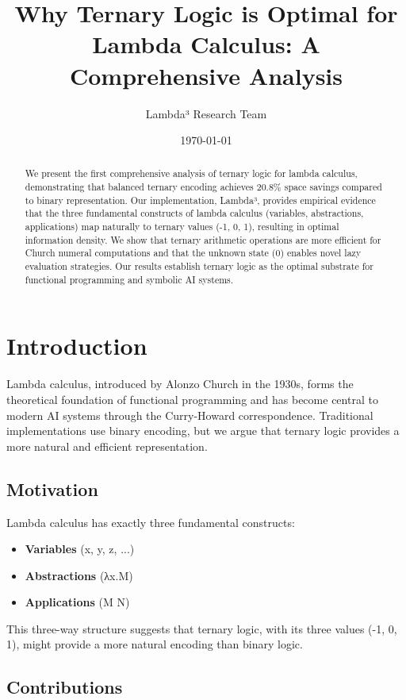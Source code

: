 \documentclass[11pt]{article}
\title{Why Ternary Logic is Optimal for Lambda Calculus: A Comprehensive Analysis}
\author{Lambda³ Research Team}
\date{\today}
\begin{document}
\maketitle

\begin{abstract}
We present the first comprehensive analysis of ternary logic for lambda calculus, demonstrating that balanced ternary encoding achieves 20.8\% space savings compared to binary representation. Our implementation, Lambda³, provides empirical evidence that the three fundamental constructs of lambda calculus (variables, abstractions, applications) map naturally to ternary values (-1, 0, 1), resulting in optimal information density. We show that ternary arithmetic operations are more efficient for Church numeral computations and that the unknown state (0) enables novel lazy evaluation strategies. Our results establish ternary logic as the optimal substrate for functional programming and symbolic AI systems.
\end{abstract}

\section{Introduction}

Lambda calculus, introduced by Alonzo Church in the 1930s, forms the theoretical foundation of functional programming and has become central to modern AI systems through the Curry-Howard correspondence. Traditional implementations use binary encoding, but we argue that ternary logic provides a more natural and efficient representation.

\subsection{Motivation}

Lambda calculus has exactly three fundamental constructs:
\begin{itemize}
    \item \textbf{Variables} (x, y, z, ...)
    \item \textbf{Abstractions} (λx.M)
    \item \textbf{Applications} (M N)
\end{itemize}

This three-way structure suggests that ternary logic, with its three values (-1, 0, 1), might provide a more natural encoding than binary logic.

\subsection{Contributions}
\end{document}
